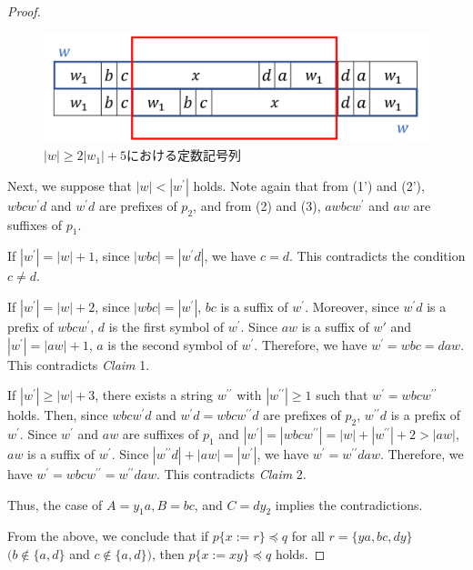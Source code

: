 \begin{proof}
\begin{figure}[t]
  \begin{center}
    \includegraphics[scale=0.35]{figs/2w1+5.png}
    \caption{$|w| \ge 2|w_{1}|+5$における定数記号列}\label{2w1+5}
  \end{center}
\end{figure}
    
  Next, we suppose that $|w| < |w^{\prime}|$ holds.
  Note again that from (1') and (2'), $wbcw^{\prime}d$ and $w^{\prime}d$ are prefixes of $p_{2}$, and from (2) and (3), $awbcw^{\prime}$ and $aw$ are suffixes of $p_{1}$.
  
  If $|w^{\prime}|=|w|+1$, since $|wbc|=|w^{\prime}d|$, we have $c=d$. This contradicts the condition $c \ne d$.
  
  If $|w^{\prime}|=|w|+2$, since $|wbc|=|w^{\prime}|$, $bc$ is a suffix of $w^{\prime}$.
  Moreover, since $w^{\prime}d$ is a prefix of $wbcw^{\prime}$, $d$ is the first symbol of $w^{\prime}$.
  Since $aw$ is a suffix of $w'$ and $|w^{\prime}|=|aw|+1$, $a$ is the second symbol of $w^{\prime}$.
  Therefore, we have $w^{\prime}=wbc=daw$.
  This contradicts \textit{Claim} 1.
  
  If $|w^{\prime}| \ge |w|+3$, there exists a string $w^{\prime\prime}$ with $|w^{\prime\prime}| \geq 1$ such that $w^{\prime} = wbcw^{\prime\prime}$ holds.
  Then, since $wbcw^{\prime}d$ and $w^{\prime}d=wbcw^{\prime\prime}d$ are prefixes of $p_{2}$, $w^{\prime\prime}d$ is a prefix of $w^{\prime}$.
  Since $w^{\prime}$ and $aw$ are suffixes of $p_{1}$ and $|w^{\prime}|=|wbcw^{\prime\prime}|=|w|+|w^{\prime\prime}|+2 > |aw|$, $aw$ is a suffix of $w^{\prime}$.
  Since $|w^{\prime\prime}d| + |aw| = |w^{\prime}|$, we have $w^{\prime} = w^{\prime\prime}daw$.
  Therefore, we have $w^{\prime}=wbcw^{\prime\prime}=w^{\prime\prime}daw$.
  This contradicts \textit{Claim} 2.

  Thus, the case of $A=y_{1}a,B=bc$, and $C=dy_{2}$ implies the contradictions.
  
  From the above, we conclude that if $p \{ x := r \} \preceq q$ for all $r = \{ ya, bc, dy \}$ $(b \not\in \{a,d\}$ and $c \not\in \{a,d\})$, then $p \{ x := xy \} \preceq q$ holds.
  \end{proof}

